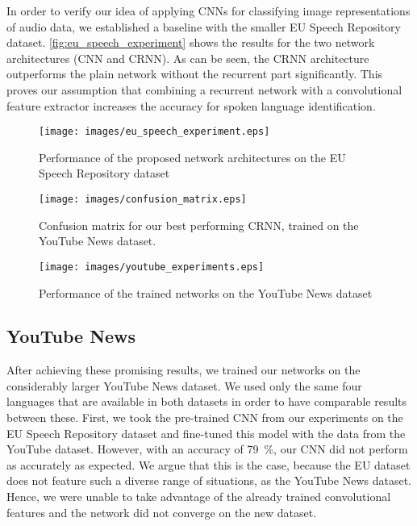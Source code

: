 \documentclass{llncs}
\begin{document}
In order to verify our idea of applying \acp{CNN} for classifying image representations of audio data, we established a baseline with the smaller EU Speech Repository dataset.
\autoref{fig:eu_speech_experiment} shows the results for the two network architectures (CNN and CRNN).
As can be seen, the \ac{CRNN} architecture outperforms the plain network without the recurrent part significantly.
This proves our assumption that combining a recurrent network with a convolutional feature extractor increases the accuracy for spoken language identification.

\begin{figure}[t]
	\begin{minipage}{0.5\linewidth}
		\centering
		\texttt{[image: images/eu\_speech\_experiment.eps]}
		\caption{Performance of the proposed network architectures on the EU Speech Repository dataset}
		\label{fig:eu_speech_experiment}
	\end{minipage}\hspace{0.5cm}
	\begin{minipage}{0.5\linewidth}
		\centering
		\texttt{[image: images/confusion\_matrix.eps]}
		\caption{Confusion matrix for our best performing \ac{CRNN}, trained on the YouTube News dataset.}
		\label{fig:confusion_matrix}
	\end{minipage}
\end{figure}
\begin{figure}[t]
	\centering
	\texttt{[image: images/youtube\_experiments.eps]}
	\caption{Performance of the trained networks on the YouTube News dataset}
	\label{fig:youtube_experiments}
\end{figure}

\subsection{YouTube News}
\label{subsec:youtube_news}

After achieving these promising results, we trained our networks on the considerably larger YouTube News dataset.
We used only the same four languages that are available in both datasets in order to have comparable  results between these.
First, we took the pre-trained \ac{CNN} from our experiments on the EU Speech Repository dataset and fine-tuned this model with the data from the YouTube dataset.
However, with an accuracy of \SI{79}{\percent}, our \ac{CNN} did not perform as accurately as expected.
We argue that this is the case, because the EU dataset does not feature such a diverse range of situations, as the YouTube News dataset.
Hence, we were unable to take advantage of the already trained convolutional features and the network did not converge on the new dataset.
\end{document}
